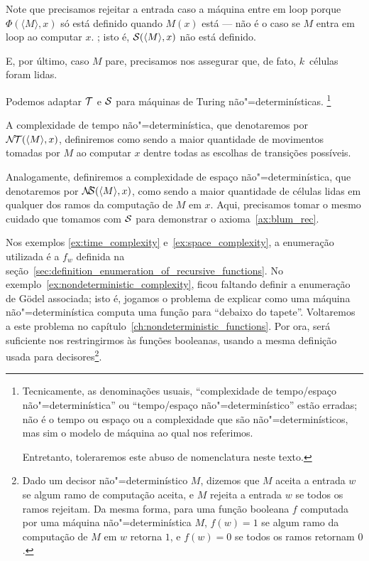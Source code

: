 \begin{example}
{        Note que precisamos rejeitar a entrada
        caso a máquina entre em loop
        porque $\Phi( \langle M \rangle, x)$ só está definido
        quando $M(x)$ está
        --- não é o caso se $M$ entra em loop
        ao computar $x$.
    };
    isto é, ${\mathcal{S}}(\langle M \rangle, x)$ não está definido.

    E, por último,
    caso $M$ pare,
    precisamos nos assegurar que,
    de fato,
    $k$~células foram lidas.
\end{example}

\begin{example}
    \label{ex:nondeterministic_complexity}
    Podemos adaptar ${\mathcal{T}}$ e ${\mathcal{S}}$
    para máquinas de Turing não"=determinísticas.%
    \footnote{
        Tecnicamente,
        as denominações usuais,
        ``complexidade de tempo/espaço não"=determinística''
        ou ``tempo/espaço não"=determinístico''
        estão erradas;
        não é o tempo ou espaço ou a complexidade que são não"=determinísticos,
        mas sim o modelo de máquina ao qual nos referimos.

        Entretanto, toleraremos este abuso de nomenclatura neste texto.
    }

    A complexidade de tempo não"=determinística,
    que denotaremos por ${\mathcal{N\!T}}(\langle M \rangle, x)$,
    definiremos como sendo a maior quantidade de movimentos
    tomadas por $M$ ao computar $x$
    dentre todas as escolhas de transições possíveis.

    Analogamente,
    definiremos a complexidade de espaço não"=determinística,
    que denotaremos por ${\mathcal{N\!\!S}}(\langle M \rangle, x)$,
    como sendo a maior quantidade de células lidas
    em qualquer dos ramos da computação de $M$ em $x$.
    Aqui, precisamos tomar o mesmo cuidado que tomamos
    com ${\mathcal{S}}$ para demonstrar o axioma~\ref{ax:blum_rec}.
\end{example}

Nos exemplos \ref{ex:time_complexity} e~\ref{ex:space_complexity},
a enumeração utilizada é a $f_w$
definida na seção~\ref{sec:definition_enumeration_of_recursive_functions}.
No exemplo~\ref{ex:nondeterministic_complexity},
ficou faltando definir a enumeração de Gödel associada;
isto é, jogamos o problema de
explicar como uma máquina não"=determinística computa uma função
para ``debaixo do tapete''.
Voltaremos a este problema no capítulo~\ref{ch:nondeterministic_functions}.
Por ora,
será suficiente nos restringirmos às funções booleanas,
usando a mesma definição usada para decisores\footnote{
    Dado um decisor não"=determinístico $M$,
    dizemos que $M$ aceita a entrada $w$
    se algum ramo de computação aceita,
    e $M$ rejeita a entrada $w$ se todos os ramos rejeitam.
    Da mesma forma,
    para uma função booleana $f$ computada por uma máquina não"=determinística $M$,
    $f(w) = 1$ se algum ramo da computação de $M$ em $w$ retorna $1$,
    e $f(w) = 0$ se todos os ramos retornam $0$.
}.

